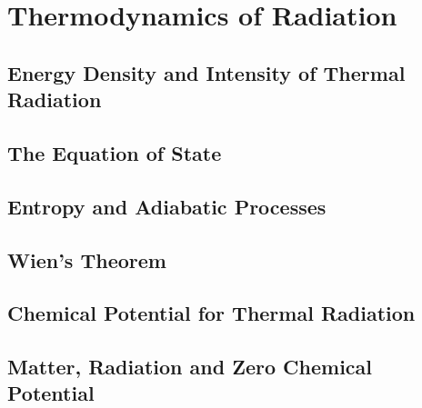 \chapter{Thermodynamics of Radiation}
\section{Energy Density and Intensity of Thermal Radiation}
\section{The Equation of State}
\section{Entropy and Adiabatic Processes}
\section{Wien's Theorem}
\section{Chemical Potential for Thermal Radiation}
\section{Matter, Radiation and Zero Chemical Potential}
